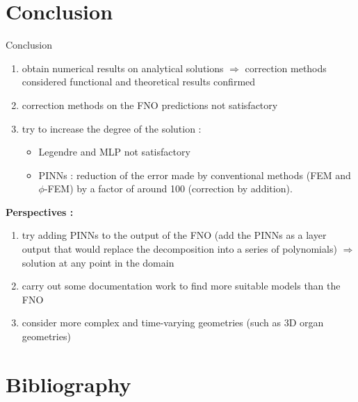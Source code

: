 \documentclass[compress,10pt,xcolor={table,dvipsnames},t]{beamer}
\begin{document}
	\section{Conclusion} %
	
	\begin{frame}{Conclusion}
		\begin{enumerate}[\ding{217}]
			\item obtain numerical results on analytical solutions $\Rightarrow$ correction methods considered functional and theoretical results confirmed
			\item correction methods on the FNO predictions not satisfactory
			\item try to increase the degree of the solution : 
			\begin{itemize}
				\item Legendre and MLP not satisfactory 
				\item PINNs : reduction of the error made by conventional methods (FEM and $\phi$-FEM) by a factor of around 100 (correction by addition). 
			\end{itemize}
		\end{enumerate}
		\textbf{Perspectives :}
		\begin{enumerate}[\ding{217}]
			\item try adding PINNs to the output of the FNO (add the PINNs as a layer output that would replace the decomposition into a series of polynomials) $\Rightarrow$ solution at any point in the domain 
			\item carry out some documentation work to find more suitable models than the FNO
			\item consider more complex and time-varying geometries (such as 3D organ geometries)
		\end{enumerate}
	\end{frame}

	\section{Bibliography}
	
	\begin{frame}[allowframebreaks]{}
		\printbibliography[heading=none]
	\end{frame}
	
\end{document}
